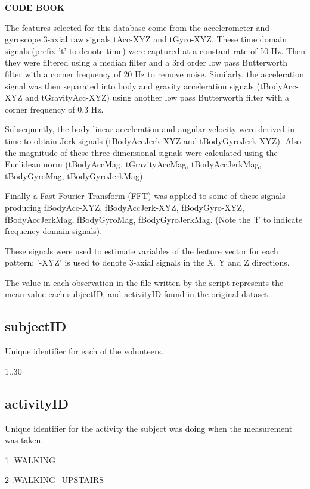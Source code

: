 \documentclass[a4paper,10pt]{report}
\begin{document}
\begin{center}
  \textbf*{CODE BOOK} 
\end{center}

The features selected for this database come from the accelerometer and gyroscope 3-axial raw signals tAcc-XYZ and tGyro-XYZ. These time domain signals (prefix 't' to denote time) were captured at a constant rate of 50 Hz. Then they were filtered using a median filter and a 3rd order low pass Butterworth filter with a corner frequency of 20 Hz to remove noise. Similarly, the acceleration signal was then separated into body and gravity acceleration signals (tBodyAcc-XYZ and tGravityAcc-XYZ) using another low pass Butterworth filter with a corner frequency of 0.3 Hz. 

Subsequently, the body linear acceleration and angular velocity were derived in time to obtain Jerk signals (tBodyAccJerk-XYZ and tBodyGyroJerk-XYZ). Also the magnitude of these three-dimensional signals were calculated using the Euclidean norm (tBodyAccMag, tGravityAccMag, tBodyAccJerkMag, tBodyGyroMag, tBodyGyroJerkMag). 

Finally a Fast Fourier Transform (FFT) was applied to some of these signals producing fBodyAcc-XYZ, fBodyAccJerk-XYZ, fBodyGyro-XYZ, fBodyAccJerkMag, fBodyGyroMag, fBodyGyroJerkMag. (Note the 'f' to indicate frequency domain signals). 

These signals were used to estimate variables of the feature vector for each pattern:
'-XYZ' is used to denote 3-axial signals in the X, Y and Z directions.

The value in each observation in the file written by the script represents the mean value each subjectID, and activityID found in the original dataset.

\subsection*{subjectID}

Unique identifier for each of the volunteers.

1..30

\subsection*{activityID}

Unique identifier for the activity the subject was doing when the measurement was taken.

   1 .WALKING

   2 .WALKING\_UPSTAIRS
\end{document}
